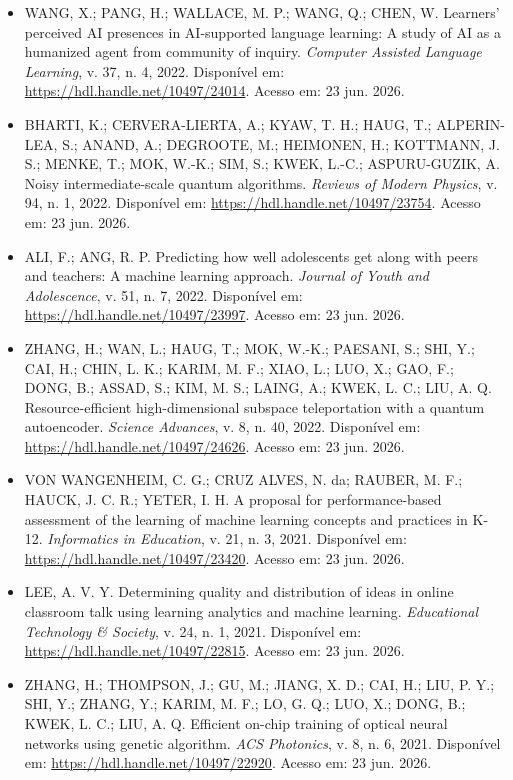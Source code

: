 \documentclass[english]{textolivre}
\begin{document}
\begin{itemize}
\item[] WANG, X.; PANG, H.; WALLACE, M. P.; WANG, Q.; CHEN, W. Learners’ perceived AI presences in AI-supported language learning: A study of AI as a humanized agent from community of inquiry. \textit{Computer Assisted Language Learning}, v. 37, n. 4, 2022. Disponível em: \url{https://hdl.handle.net/10497/24014}. Acesso em: 23 jun. 2026.

\item[] BHARTI, K.; CERVERA-LIERTA, A.; KYAW, T. H.; HAUG, T.; ALPERIN-LEA, S.; ANAND, A.; DEGROOTE, M.; HEIMONEN, H.; KOTTMANN, J. S.; MENKE, T.; MOK, W.-K.; SIM, S.; KWEK, L.-C.; ASPURU-GUZIK, A. Noisy intermediate-scale quantum algorithms. \textit{Reviews of Modern Physics}, v. 94, n. 1, 2022. Disponível em: \url{https://hdl.handle.net/10497/23754}. Acesso em: 23 jun. 2026.

\item[] ALI, F.; ANG, R. P. Predicting how well adolescents get along with peers and teachers: A machine learning approach. \textit{Journal of Youth and Adolescence}, v. 51, n. 7, 2022. Disponível em: \url{https://hdl.handle.net/10497/23997}. Acesso em: 23 jun. 2026.

\item[] ZHANG, H.; WAN, L.; HAUG, T.; MOK, W.-K.; PAESANI, S.; SHI, Y.; CAI, H.; CHIN, L. K.; KARIM, M. F.; XIAO, L.; LUO, X.; GAO, F.; DONG, B.; ASSAD, S.; KIM, M. S.; LAING, A.; KWEK, L. C.; LIU, A. Q. Resource-efficient high-dimensional subspace teleportation with a quantum autoencoder. \textit{Science Advances}, v. 8, n. 40, 2022. Disponível em: \url{https://hdl.handle.net/10497/24626}. Acesso em: 23 jun. 2026.

\item[] VON WANGENHEIM, C. G.; CRUZ ALVES, N. da; RAUBER, M. F.; HAUCK, J. C. R.; YETER, I. H. A proposal for performance-based assessment of the learning of machine learning concepts and practices in K-12. \textit{Informatics in Education}, v. 21, n. 3, 2021. Disponível em: \url{https://hdl.handle.net/10497/23420}. Acesso em: 23 jun. 2026.

\item[] LEE, A. V. Y. Determining quality and distribution of ideas in online classroom talk using learning analytics and machine learning. \textit{Educational Technology \& Society}, v. 24, n. 1, 2021. Disponível em: \url{https://hdl.handle.net/10497/22815}. Acesso em: 23 jun. 2026.

\item[] ZHANG, H.; THOMPSON, J.; GU, M.; JIANG, X. D.; CAI, H.; LIU, P. Y.; SHI, Y.; ZHANG, Y.; KARIM, M. F.; LO, G. Q.; LUO, X.; DONG, B.; KWEK, L. C.; LIU, A. Q. Efficient on-chip training of optical neural networks using genetic algorithm. \textit{ACS Photonics}, v. 8, n. 6, 2021. Disponível em: \url{https://hdl.handle.net/10497/22920}. Acesso em: 23 jun. 2026.


\end{itemize}
\end{document}
